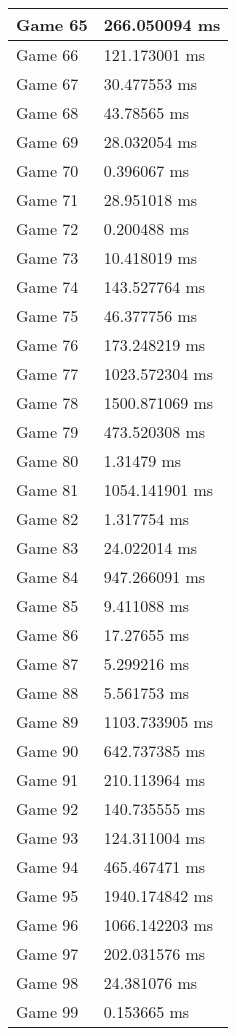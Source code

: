 \begin{multicols}{2}
\begin{tabular}{|l|l|}
	Game 65 & 266.050094 ms \\ \hline
	Game 66 & 121.173001 ms \\ \hline
	Game 67 & 30.477553 ms \\ \hline
	Game 68 & 43.78565 ms \\ \hline
	Game 69 & 28.032054 ms \\ \hline
	Game 70 & 0.396067 ms \\ \hline
	Game 71 & 28.951018 ms \\ \hline
	Game 72 & 0.200488 ms \\ \hline
	Game 73 & 10.418019 ms \\ \hline
	Game 74 & 143.527764 ms \\ \hline
	Game 75 & 46.377756 ms \\ \hline
	Game 76 & 173.248219 ms \\ \hline
	Game 77 & 1023.572304 ms \\ \hline
	Game 78 & 1500.871069 ms \\ \hline
	Game 79 & 473.520308 ms \\ \hline
	Game 80 & 1.31479 ms \\ \hline
	Game 81 & 1054.141901 ms \\ \hline
	Game 82 & 1.317754 ms \\ \hline
	Game 83 & 24.022014 ms \\ \hline
	Game 84 & 947.266091 ms \\ \hline
	Game 85 & 9.411088 ms \\ \hline
	Game 86 & 17.27655 ms \\ \hline
	Game 87 & 5.299216 ms \\ \hline
	Game 88 & 5.561753 ms \\ \hline
	Game 89 & 1103.733905 ms \\ \hline
	Game 90 & 642.737385 ms \\ \hline
	Game 91 & 210.113964 ms \\ \hline
	Game 92 & 140.735555 ms \\ \hline
	Game 93 & 124.311004 ms \\ \hline
	Game 94 & 465.467471 ms \\ \hline
	Game 95 & 1940.174842 ms \\ \hline
	Game 96 & 1066.142203 ms \\ \hline
	Game 97 & 202.031576 ms \\ \hline
	Game 98 & 24.381076 ms \\ \hline
	Game 99 & 0.153665 ms \\ \hline

\end{tabular}
\end{multicols}

